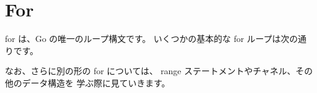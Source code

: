 \section{For}

for は、Go の唯一のループ構文です。 いくつかの基本的な for ループは次の通りです。




なお、さらに別の形の for については、 range ステートメントやチャネル、その他のデータ構造を 学ぶ際に見ていきます。